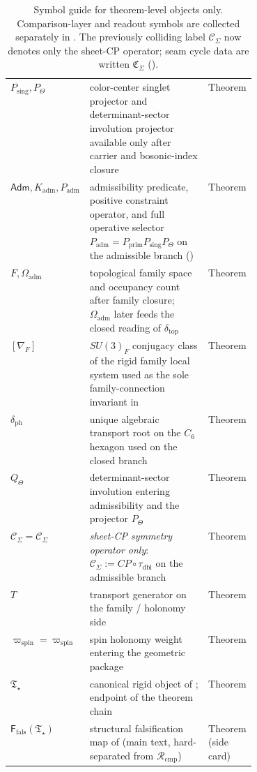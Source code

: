 \documentclass[11pt,a4paper]{article}
\theoremstyle{definition}
\theoremstyle{remark}
\newcommand{\taudbl}{\tau_{\mathrm{dbl}}}
\newcommand{\deltatop}{\delta_{\mathrm{top}}}
\newcommand{\Oadm}{\Omega_{\mathrm{adm}}}
\newcommand{\Kadm}{K_{\mathrm{adm}}}
\newcommand{\Padm}{P_{\mathrm{adm}}}
\newcommand{\Pprim}{P_{\mathrm{prim}}}
\newcommand{\Tstar}{\mathfrak T_{\star}}
\newcommand{\Cseam}{\mathcal C_{\Sigma}}
\newcommand{\Ffals}{\mathsf F_{\mathrm{fals}}}
\newcommand{\Rcmp}{\mathcal R_{\mathrm{cmp}}}
\newcommand{\wspin}{\varpi_{\mathrm{spin}}}
\begin{document}
\begin{table}[p]
\begin{tabularx}{\linewidth}{@{}>{\raggedright\arraybackslash}p{0.23\linewidth}Y>{\raggedright\arraybackslash}p{0.18\linewidth}@{}}
$P_{\mathrm{sing}},P_\Theta$ & color-center singlet projector and determinant-sector involution projector available only after carrier and bosonic-index closure & Theorem \\
$\mathsf{Adm},\Kadm,\Padm$ & admissibility predicate, positive constraint operator, and full operative selector $\Padm=\Pprim P_{\mathrm{sing}}P_\Theta$ on the admissible branch () & Theorem \\
$F,\Oadm$ & topological family space and occupancy count after family closure; $\Oadm$ later feeds the closed reading of $\deltatop$ & Theorem \\
$[\nabla_F]$ & $SU(3)_F$ conjugacy class of the rigid family local system used as the sole family-connection invariant in  & Theorem \\
$\delta_{\mathrm{ph}}$ & unique algebraic transport root on the $C_6$ hexagon used on the closed branch & Theorem \\
$Q_\Theta$ & determinant-sector involution entering admissibility and the projector $P_\Theta$ & Theorem \\
$\Cseam=\mathcal C_\Sigma$ & \emph{sheet-CP symmetry operator only}: $\Cseam:=CP\circ\taudbl$ on the admissible branch & Theorem \\
$T$ & transport generator on the family / holonomy side & Theorem \\
$\wspin=\varpi_{\mathrm{spin}}$ & spin holonomy weight entering the geometric package & Theorem \\
$\Tstar$ & canonical rigid object of ; endpoint of the theorem chain & Theorem \\
$\Ffals(\Tstar)$ & structural falsification map of  (main text, hard-separated from $\Rcmp$) & Theorem (side card) \\
\bottomrule
\end{tabularx}
\caption{Symbol guide for theorem-level objects only. Comparison-layer and readout symbols are
collected separately in . The previously colliding label
$\mathcal C_\Sigma$ now denotes only the sheet-CP operator; seam cycle data are written
$\mathfrak C_\Sigma$ ().}
\label{tab:symbol-guide-theorem}
\label{tab:symbol-guide}
\end{table}
\end{document}
